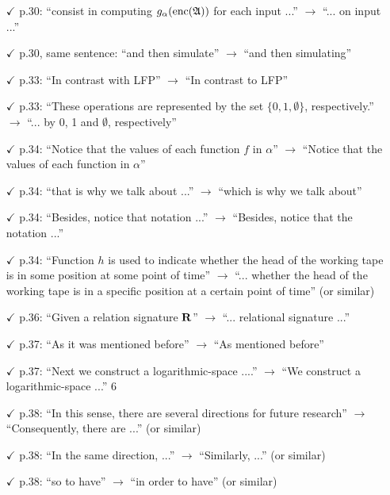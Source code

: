 \documentclass[a4paper]{article}
\begin{document}
\begin{itemize}
	\item[$\checkmark$] p.30: ``consist in computing $g_{\alpha}({\rm enc}(\mathfrak{A}))$ for each input ...'' $\to$ ``... on input ...''
	\item[$\checkmark$] p.30, same sentence: ``and then simulate'' $\to$ ``and then simulating''
	\item[$\checkmark$] p.33: ``In contrast with LFP'' $\to$ ``In contrast to LFP''
	\item[$\checkmark$] p.33: ``These operations are represented by the set $\{0,1,\emptyset\}$, respectively.'' $\to$ ``... by 0, 1 and
	$\emptyset$, respectively''
	\item[$\checkmark$] p.34: ``Notice that the values of each function $f$ in $\alpha$'' $\to$ ``Notice that the values of each
	function in $\alpha$''
	\item[$\checkmark$] p.34: ``that is why we talk about ...'' $\to$ ``which is why we talk about''
	\item[$\checkmark$] p.34: ``Besides, notice that notation ...'' $\to$ ``Besides, notice that the notation ...''
	\item[$\checkmark$] p.34: ``Function $h$ is used to indicate whether the head of the working tape is in some position
	at some point of time'' $\to$ ``... whether the head of the working tape is in a specific position
	at a certain point of time'' (or similar)
	\item[$\checkmark$] p.36: ``Given a relation signature $\mathbf{R}$'' $\to$ ``... relational signature ...''
	\item[$\checkmark$] p.37: ``As it was mentioned before'' $\to$ ``As mentioned before''
	\item[$\checkmark$] p.37: ``Next we construct a logarithmic-space ....'' $\to$ ``We construct a logarithmic-space ...''
	6
	\item[$\checkmark$] p.38: ``In this sense, there are several directions for future research'' $\to$ ``Consequently, there
	are ...'' (or similar)
	\item[$\checkmark$] p.38: ``In the same direction, ...'' $\to$ ``Similarly, ...'' (or similar)
	\item[$\checkmark$] p.38: ``so to have'' $\to$ ``in order to have'' (or similar)
\end{itemize}
\vspace{1em}
\end{document}
